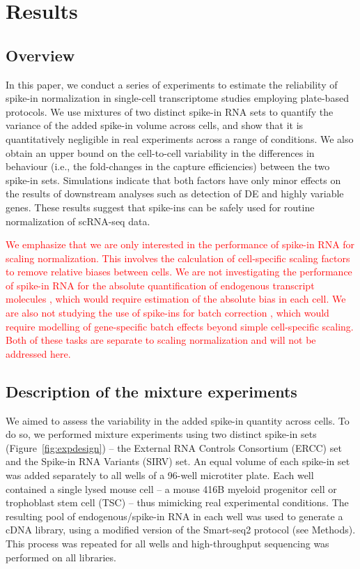 \documentclass{article}
\newcommand{\revised}[1]{\textcolor{red}{#1}}
\begin{document}
\section*{Results}

\subsection*{Overview}
In this paper, we conduct a series of experiments to estimate the reliability of spike-in normalization in single-cell transcriptome studies employing plate-based protocols.
We use mixtures of two distinct spike-in RNA sets to quantify the variance of the added spike-in volume across cells, 
and show that it is quantitatively negligible in real experiments across a range of conditions. 
We also obtain an upper bound on the cell-to-cell variability in the differences in behaviour (i.e., the fold-changes in the capture efficiencies) between the two spike-in sets.
Simulations indicate that both factors have only minor effects on the results of downstream analyses such as detection of DE and highly variable genes.
These results suggest that spike-ins can be safely used for routine normalization of scRNA-seq data.

\revised{We emphasize that we are only interested in the performance of spike-in RNA for scaling normalization.
This involves the calculation of cell-specific scaling factors to remove relative biases between cells.
We are not investigating the performance of spike-in RNA for the absolute quantification of endogenous transcript molecules \autocite{svensson2017power},
which would require estimation of the absolute bias in each cell.
We are also not studying the use of spike-ins for batch correction \autocite{tung2016batch}, which would require modelling of gene-specific batch effects beyond simple cell-specific scaling.
Both of these tasks are separate to scaling normalization and will not be addressed here.
}

\subsection*{Description of the mixture experiments}
We aimed to assess the variability in the added spike-in quantity across cells.
To do so, we performed mixture experiments using two distinct spike-in sets (Figure~\ref{fig:expdesign}) -- the External RNA Controls Consortium (ERCC) set and the Spike-in RNA Variants (SIRV) set.
An equal volume of each spike-in set was added separately to all wells of a 96-well microtiter plate.
Each well contained a single lysed mouse cell -- a mouse 416B myeloid progenitor cell or trophoblast stem cell (TSC) -- thus mimicking real experimental conditions.
The resulting pool of endogenous/spike-in RNA in each well was used to generate a cDNA library, using a modified version of the Smart-seq2 protocol (see Methods).
This process was repeated for all wells and high-throughput sequencing was performed on all libraries.
\end{document}
